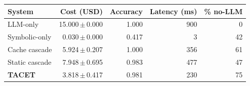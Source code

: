 \begin{tabular}{lrrrr}
\toprule
System & Cost (USD) & Accuracy & Latency (ms) & \% no-LLM \\
\midrule
LLM-only & 15.000\,$\pm$\,0.000 & 1.000 & 900 & 0 \\
Symbolic-only & 0.030\,$\pm$\,0.000 & 0.417 & 3 & 42 \\
Cache cascade & 5.924\,$\pm$\,0.207 & 1.000 & 356 & 61 \\
Static cascade & 7.948\,$\pm$\,0.695 & 0.983 & 477 & 47 \\
\textbf{TACET} & 3.818\,$\pm$\,0.417 & 0.981 & 230 & 75 \\
\bottomrule
\end{tabular}